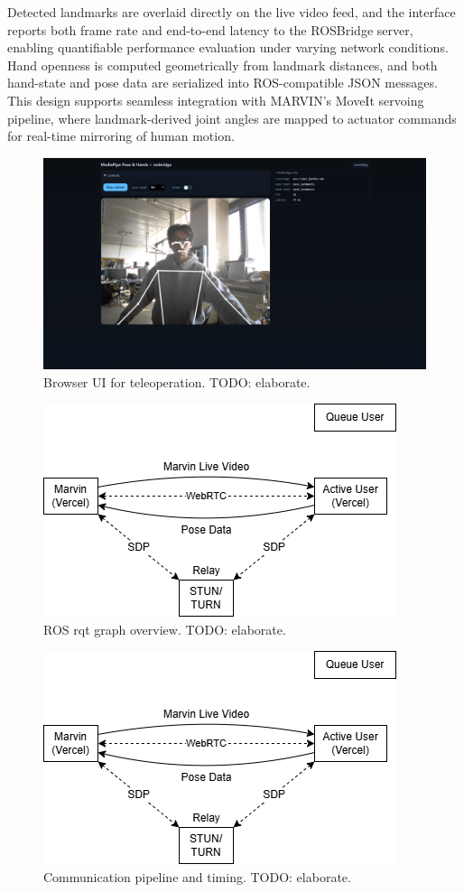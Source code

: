 \documentclass[manuscript,screen]{acmart} %
\begin{document}
Detected landmarks are overlaid directly on the live video feed, and the interface 
reports both frame rate and end-to-end latency to the ROSBridge server, enabling 
quantifiable performance evaluation under varying network conditions. Hand 
openness is computed geometrically from landmark distances, and both hand-state 
and pose data are serialized into ROS-compatible JSON messages. This design 
supports seamless integration with MARVIN’s MoveIt servoing pipeline, where 
landmark-derived joint angles are mapped to actuator commands for real-time 
mirroring of human motion.

\begin{figure}[htbp]
  \centering
  \includegraphics[width=0.5\linewidth]{assets/web-ui}
  \caption{Browser UI for teleoperation. TODO: elaborate.}
  \label{fig:ui}
\end{figure}

\begin{figure}[htbp]
  \centering
  \includegraphics[width=0.5\linewidth]{assets/system-diagram}
  \caption{ROS rqt graph overview. TODO: elaborate.}
  \label{fig:system}
\end{figure}

\begin{figure}[htbp]
  \centering
  \includegraphics[width=0.5\linewidth]{assets/system-diagram.png}
  \caption{Communication pipeline and timing. TODO: elaborate.}
  \label{fig:pipeline}
\end{figure}
\end{document}
